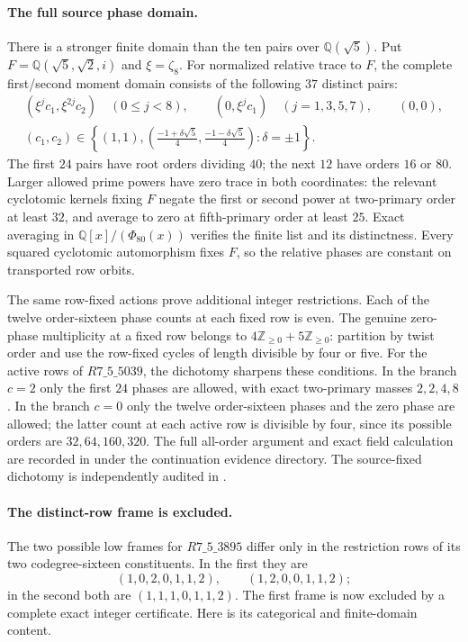 \paragraph{The full source phase domain.}
There is a stronger finite domain than the ten pairs over
$\mathbb Q(\sqrt5)$.  Put
$F=\mathbb Q(\sqrt5,\sqrt2,i)$ and $\xi=\zeta_8$.
For normalized relative trace to $F$, the complete first/second
moment domain consists of the following $37$ distinct pairs:
\[
\begin{gathered}
 (\xi^j c_1,\xi^{2j}c_2)\quad(0\leq j<8),\qquad
 (0,\xi^j c_1)\quad(j=1,3,5,7),\qquad (0,0),\\
 (c_1,c_2)\in\left\{(1,1),
 \left(\frac{-1+\delta\sqrt5}{4},
       \frac{-1-\delta\sqrt5}{4}\right):\delta=\pm1\right\}.
\end{gathered}
\]
The first $24$ pairs have root orders dividing $40$; the next $12$
have orders $16$ or $80$.  Larger allowed prime powers have zero
trace in both coordinates: the relevant cyclotomic kernels fixing
$F$ negate the first or second power at two-primary order at least
$32$, and average to zero at fifth-primary order at least $25$.
Exact averaging in $\mathbb Q[x]/(\Phi_{80}(x))$ verifies the finite
list and its distinctness.  Every squared cyclotomic automorphism
fixes $F$, so the relative phases are constant on transported row
orbits.

The same row-fixed actions prove additional integer restrictions.
Each of the twelve order-sixteen phase counts at each fixed row is
even.  The genuine zero-phase multiplicity at a fixed row belongs to
$4\mathbb Z_{\geq0}+5\mathbb Z_{\geq0}$: partition by twist order
and use the row-fixed cycles of length divisible by four or five.
For the active rows of $R7\_5\_5039$, the dichotomy sharpens these
conditions.  In the branch $c=2$ only the first $24$ phases are
allowed, with exact two-primary masses $2,2,4,8$.  In the branch
$c=0$ only the twelve order-sixteen phases and the zero phase are
allowed; the latter count at each active row is divisible by four,
since its possible orders are $32,64,160,320$.
The full all-order argument and exact field calculation are recorded
in  under the
continuation evidence directory.  The source-fixed dichotomy is
independently audited in .

\paragraph{The distinct-row frame is excluded.}
The two possible low frames for $R7\_5\_3895$ differ only in the
restriction rows of its two codegree-sixteen constituents.  In the
first they are
\[
 (1,0,2,0,1,1,2),\qquad (1,2,0,0,1,1,2);
\]
in the second both are $(1,1,1,0,1,1,2)$.
The first frame is now excluded by a complete exact integer
certificate.  Here is its categorical and finite-domain content.

